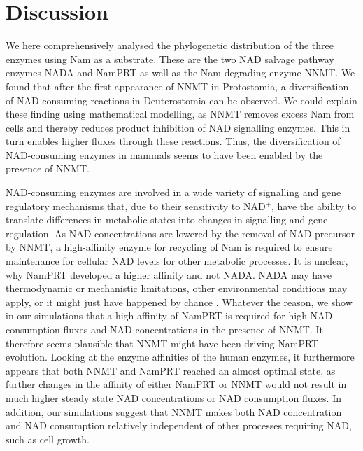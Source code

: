 
\section{Discussion}

We here comprehensively analysed the phylogenetic distribution of the three enzymes using Nam as a substrate. These are the two NAD salvage pathway enzymes NADA and NamPRT as well as the Nam-degrading enzyme NNMT. We found that after the first appearance of NNMT in Protostomia, a diversification of NAD-consuming reactions in Deuterostomia can be observed. We could explain these finding using mathematical modelling, as NNMT removes excess Nam from cells and thereby reduces product inhibition of NAD signalling enzymes. This in turn enables higher fluxes through these reactions. Thus, the diversification of NAD-consuming enzymes in mammals seems to have been enabled by the presence of NNMT.


NAD-consuming enzymes are involved in a wide variety of signalling and gene regulatory mechanisms that, due to their sensitivity to NAD$^{+}$, have the ability to translate differences in metabolic states into changes in signalling and gene regulation. As NAD concentrations are lowered by the removal of NAD precursor by NNMT, a high-affinity enzyme for recycling of Nam is required to ensure maintenance for cellular NAD levels for other metabolic processes. It is unclear, why NamPRT developed a higher affinity and not NADA. NADA may have thermodynamic or mechanistic limitations, other environmental conditions may apply, or it might just have happened by chance . Whatever the reason, we show in our simulations that a high affinity of NamPRT is required for high NAD consumption fluxes and NAD concentrations in the presence of NNMT. It therefore seems plausible that NNMT might have been driving NamPRT evolution. Looking at the enzyme affinities of the human enzymes, it furthermore appears that both NNMT and NamPRT reached an almost optimal state, as further changes in the affinity of either NamPRT or NNMT would not result in much higher steady state NAD concentrations or NAD consumption fluxes. In addition, our simulations suggest that NNMT makes both NAD concentration and NAD consumption relatively independent of other processes requiring NAD, such as cell growth.

